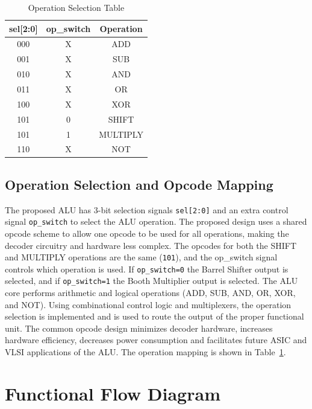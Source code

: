 \documentclass[conference]{IEEEtran}
\begin{document}
\begin{table}[h]
\centering

\renewcommand{\arraystretch}{1.3}
\setlength{\tabcolsep}{6pt}

\caption{Operation Selection Table}

\begin{tabular}{|c|c|c|}
\hline
\label{tab:opcode}
\textbf{sel[2:0]} & \textbf{op\_switch} & \textbf{Operation} \\
\hline
000 & X & ADD \\
\hline
001 & X & SUB \\
\hline
010 & X & AND \\
\hline
011 & X & OR \\
\hline
100 & X & XOR \\
\hline
101 & 0 & SHIFT \\
\hline
101 & 1 & MULTIPLY \\
\hline
110 & X & NOT \\
\hline

\end{tabular}

\end{table}

\subsection{Operation Selection and Opcode Mapping}
The proposed ALU has 3-bit selection signals \texttt{sel[2:0]} and an extra control signal \texttt{op\_switch} to select the ALU operation. The proposed design uses a shared opcode scheme to allow one opcode to be used for all operations, making the decoder circuitry and hardware less complex. The opcodes for both the SHIFT and MULTIPLY operations are the same (\texttt{101}), and the op\_switch signal controls which operation is used. If \texttt{op\_switch=0} the Barrel Shifter output is selected, and if \texttt{op\_switch=1} the Booth Multiplier output is selected. The ALU core performs arithmetic and logical operations (ADD, SUB, AND, OR, XOR, and NOT). Using combinational control logic and multiplexers, the operation selection is implemented and is used to route the output of the proper functional unit. The common opcode design minimizes decoder hardware, increases hardware efficiency, decreases power consumption and facilitates future ASIC and VLSI applications of the ALU. The operation mapping is shown in Table~\ref{tab:opcode}.

\section{Functional Flow Diagram}
\end{document}
